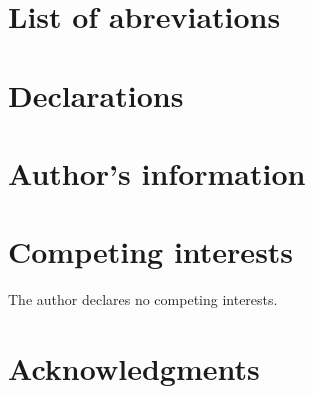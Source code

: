 \documentclass[dvipsnames]{bmcart}
\theoremstyle{definition}
\begin{document}
\section{List of abreviations}





\section*{Declarations}

\begin{backmatter}

\section*{Author's information}


\section*{Competing interests}
  The author declares no competing interests. 
  

\section*{Acknowledgments}





\end{backmatter}
\end{document}
